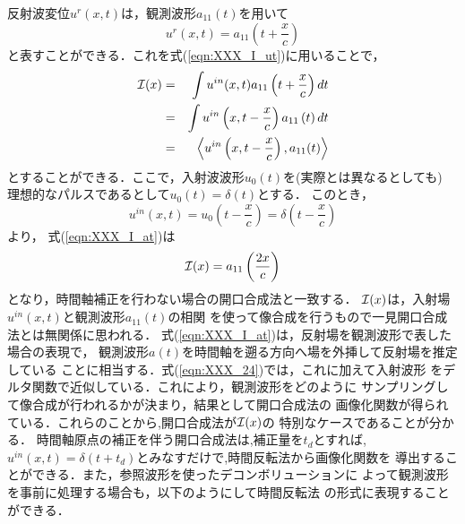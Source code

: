 反射波変位$u^{r}(x,t)$は，観測波形$a_{11}(t)$を用いて
\begin{equation}
	u^r(x,t)=a_{11}\left(t+\frac{x}{c}\right)
	\label{eqn:}
\end{equation}
と表すことができる．これを式(\ref{eqn:XXX_I_ut})に用いることで，
\begin{eqnarray}
	{\cal I}(x) &= & 
	\int u^{in}(x,t) a_{11}\left(t+\frac{x}{c}\right) dt
	\\
	&=&
	 \int u^{in}\left(x,t-\frac{x}{c}\right) a_{11}\left(t\right) dt \\
	&=&
	\left< u^{in}\left(x,t-\frac{x}{c}\right), a_{11}(t) \right>
	\label{eqn:XXX_I_at}
\end{eqnarray}
とすることができる．ここで，入射波波形$u_0(t)$を(実際とは異なるとしても)
理想的なパルスであるとして$u_0(t)=\delta(t)$とする．
このとき，
\begin{equation}
	u^{in}(x,t)=
	u_0\left(t-\frac{x}{c}\right)
	=
	\delta \left(t-\frac{x}{c}\right)
	\label{eqn:}
\end{equation}
より， 式(\ref{eqn:XXX_I_at})は
\begin{equation}
	{\cal I}(x)=a_{11}\left(\frac{2x}{c}\right)
	\label{eqn:XXX_24}
\end{equation}
となり，時間軸補正を行わない場合の開口合成法と一致する．
${\cal I}(x)$は，入射場$u^{in}(x,t)$と観測波形$a_{11}(t)$の相関
を使って像合成を行うもので一見開口合成法とは無関係に思われる．
式(\ref{eqn:XXX_I_at})は，反射場を観測波形で表した場合の表現で，
観測波形$a(t)$を時間軸を遡る方向へ場を外挿して反射場を推定している
ことに相当する．式(\ref{eqn:XXX_24})では，これに加えて入射波形
をデルタ関数で近似している．これにより，観測波形をどのように
サンプリングして像合成が行われるかが決まり，結果として開口合成法の
画像化関数が得られている．これらのことから,開口合成法が${\cal I}(x)$の
特別なケースであることが分かる．
時間軸原点の補正を伴う開口合成法は,補正量を$t_d$とすれば,
$u^{in}(x,t)=\delta(t+t_d)$とみなすだけで,時間反転法から画像化関数を
導出することができる．また，参照波形を使ったデコンボリューションに
よって観測波形を事前に処理する場合も，以下のようにして時間反転法
の形式に表現することができる．

